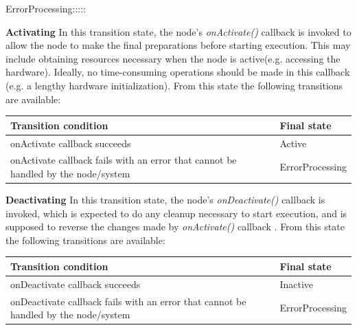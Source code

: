 \begin{labeling}{ErrorProcessing:::::}
		\item[\textbf{Activating}] In this transition state, the node's \textit{onActivate()} callback is invoked to allow the node to make the final preparations before starting execution. This may include obtaining resources necessary when the node is active(e.g. accessing the hardware). Ideally, no time-consuming operations should be made in this callback (e.g. a lengthy hardware initialization).
		From this state the following transitions are available:
		\begin{table}[H]
			\flushright
			\label{tab:Valid transitions}
			\begin{tabular}{|p{8.5cm}|p{3cm}|}
				\toprule
				Transition condition & Final state\\
				\midrule
				onActivate  callback succeeds & Active \\
				onActivate callback fails with an error that cannot be handled by the node/system  & ErrorProcessing \\
				\bottomrule
			\end{tabular}
		\end{table}

		\item[\textbf{Deactivating}] In this transition state, the node's \textit{onDeactivate()} callback is invoked, which is expected to do any cleanup necessary to start execution, and is supposed to reverse the changes made by \textit{onActivate()} callback .
		From this state the following transitions are available:
		\begin{table}[H]
			\flushright
			\label{tab:Valid transitions}
			\begin{tabular}{|p{8.5cm}|p{3cm}|}
				\toprule
				Transition condition & Final state\\
				\midrule
				onDeactivate callback succeeds & Inactive \\
				onDeactivate callback fails with an error that cannot be handled by the node/system  & ErrorProcessing \\
				\bottomrule
			\end{tabular}
		\end{table}


\end{labeling}
